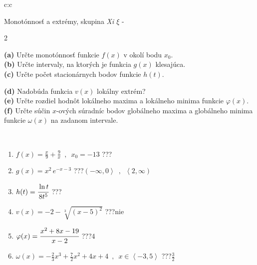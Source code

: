 \documentclass[10pt]{report}
\begin{document}
\newpage
\thispagestyle{empty}
\begin{tabular}{c:c}
\begin{minipage}[c][104.5mm][t]{0.5\linewidth}
\begin{center}
\vspace{7mm}
{\huge Monotónnosť a extrémy, skupina \textit{Xi $\xi$} -}\\[5mm]
\begin{minipage}{0.95\linewidth}
\begin{center}
{\small \begin{multicols}{2} \raggedright
\textbf{(a)} Určte monotónnosť funkcie \(f(x)\) v okolí bodu \(x_0\). \\[1mm]
\textbf{(b)} Určte intervaly, na ktorých je funkcia \(g(x)\) klesajúca. \\[1mm]
\textbf{(c)} Určte počet stacionárnych bodov funkcie \(h(t)\). \par \columnbreak
\textbf{(d)} Nadobúda funkcia \(v(x)\) lokálny extrém? \\[1mm]
\textbf{(e)} Určte rozdiel hodnôt lokálneho maxima a lokálneho minima funkcie \(\varphi(x)\). \\[1mm]
\textbf{(f)} Určte súčin \(x\)-ových súradníc bodov globálneho maxima a globálneho minima funkcie \(\omega(x)\) na zadanom intervale. \\[1mm]
\end{multicols}
}
\end{center}
\end{minipage}
\\[4mm]
\begin{minipage}{0.79\linewidth}
\begin{center}
\begin{varwidth}{\linewidth}
\begin{enumerate}
\normalsize
\item $f(x)=\frac{x}{9}+\frac{9}{x} \enspace , \enspace x_0=-13$\quad \dotfill\; ???\;\dotfill \quad {}
\item $g(x)=x^2\, e^{-x-3}$\quad \dotfill\; ???\;\dotfill \quad $\left(-\infty , 0\right\rangle\enspace , \enspace \left\langle2 , \infty\right)$
\item $h(t)=\cfrac{\ln t}{8t^5}$\quad \dotfill\; ???\;\dotfill {}
\item $v(x)=-2-\sqrt[3]{(x-5)^2}$\quad \dotfill\; ???\;\dotfill \quad $\text{nie}$
\item $\varphi(x)=\cfrac{x^2+8x-19}{x-2}$\quad \dotfill\; ???\;\dotfill \quad $4$
\item $\omega(x)=-\frac{2}{3}x^3+\frac{7}{2}x^2+4x+4 \enspace , \enspace x\in\left\langle-3 , 5\right\rangle$\quad \dotfill\; ???\;\dotfill \quad $\frac{3}{2}$

\end{enumerate}
\end{varwidth}
\end{center}
\end{minipage}
\end{center}
\end{minipage}
\end{tabular}
\end{document}
